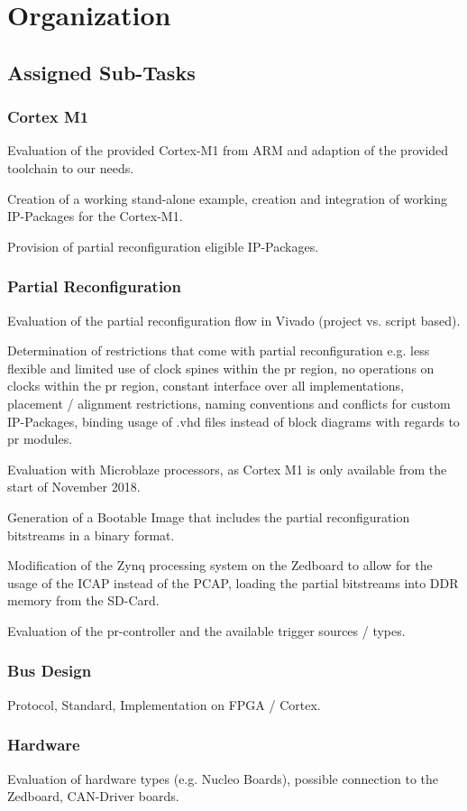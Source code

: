\chapter{Organization}

\section{Assigned Sub-Tasks}
 \subsection{Cortex M1} 
 Evaluation of the provided Cortex-M1 from ARM and adaption of the provided toolchain to our needs. 

 Creation of a working stand-alone example, creation and integration of working IP-Packages for the Cortex-M1.

 Provision of partial reconfiguration eligible IP-Packages.
 \subsection{Partial Reconfiguration}
 Evaluation of the partial reconfiguration flow in Vivado (project vs. script based).

 Determination of restrictions that come with partial reconfiguration e.g. less flexible and limited use of clock spines within the pr region, no operations on clocks within the pr region, constant interface over all implementations, placement / alignment restrictions, naming conventions and conflicts for custom IP-Packages, binding usage of .vhd files instead of block diagrams with regards to pr modules. 

 Evaluation with Microblaze processors, as Cortex M1 is only available from the start of November 2018.

 Generation of a Bootable Image that includes the partial reconfiguration bitstreams in a binary format.

 Modification of the Zynq processing system on the Zedboard to allow for the usage of the ICAP instead of the PCAP, loading the partial bitstreams into DDR memory from the SD-Card.

 Evaluation of the pr-controller and the available trigger sources / types.
 \subsection{Bus Design}
 Protocol, Standard, Implementation on FPGA / Cortex.
 \subsection{Hardware}
 Evaluation of hardware types (e.g. Nucleo Boards), possible connection to the Zedboard, CAN-Driver boards. 
